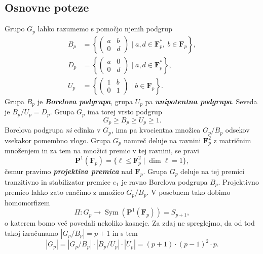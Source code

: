 \documentclass[11pt]{book}
\def\FF{\mathbf{F}}
\def\PP{\mathbf{P}}
\DeclareMathOperator\Sym{Sym}
\def\definicija{\color{rdeca}\bf\em}
\theoremstyle{definition}
\theoremstyle{zgled}
\theoremstyle{odprtproblem}
\theoremstyle{domacanaloga}
\theoremstyle{izrek}
\begin{document}
\subsection{Osnovne poteze}

Grupo $G_p$ lahko razumemo s pomočjo njenih podgrup
\begin{align*}
    B_p &= \left\{ \begin{pmatrix} a & b \\ 0 & d \end{pmatrix} \mid a,d \in \FF_p^*, \ b \in \FF_p \right\}, \\
    D_p &= \left\{ \begin{pmatrix} a & 0 \\ 0 & d \end{pmatrix} \mid a,d \in \FF_p^* \right\}, \\
    U_p &= \left\{ \begin{pmatrix} 1 & b \\ 0 & 1 \end{pmatrix} \mid b \in \FF_p \right\}.
\end{align*}
Grupa $B_p$ je {\definicija Borelova podgrupa}, grupa $U_p$ pa {\definicija unipotentna podgrupa}. Seveda je $B_p/U_p = D_p$. Grupa $G_p$ ima torej vrsto podgrup
\[
    G_p \geq B_p \geq U_p \geq 1.
\]
Borelova podgrupa \emph{ni} edinka v $G_p$, ima pa kvocientna množica $G_p/B_p$  odsekov vsekakor pomembno vlogo. Grupa $G_p$ namreč deluje na ravnini $\FF_p^2$ z matričnim množenjem in za tem na množici premic v tej ravnini, se pravi
\[
    \PP^1(\FF_p) = \{ \ell \leq \FF_p^2 \mid \dim \ell = 1 \},
\]
čemur pravimo {\definicija projektiva premica} nad $\FF_p$. Grupa $G_p$ deluje na tej premici tranzitivno in stabilizator premice $e_1$ je ravno Borelova podgrupa $B_p$. Projektivno premico lahko zato enačimo z množico $G_p/B_p$. V posebnem tako dobimo homomorfizem 
\[
    \Pi \colon G_p \to \Sym(\PP^1(\FF_p)) = S_{p+1},
\]
o katerem bomo več povedali nekoliko kasneje. Za zdaj ne spreglejmo, da od tod takoj izračunamo $|G_p/B_p| = p+1$ in s tem 
\[
    |G_p| = |G_p/B_p| \cdot |B_p/U_p| \cdot |U_p| = (p+1) \cdot (p-1)^2 \cdot p.
\]
\end{document}
